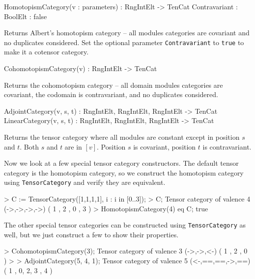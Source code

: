\begin{intrinsics}
HomotopismCategory(v : parameters) : RngIntElt -> TenCat
    Contravariant : BoolElt : false
\end{intrinsics}

Returns Albert's homotopism category -- all modules categories are covariant 
and 
no duplicates considered.
Set the optional parameter {\tt Contravariant} to {\tt true} to make it a cotensor category.

\begin{intrinsics}
CohomotopismCategory(v) : RngIntElt -> TenCat
\end{intrinsics}

Returns the cohomotopism category -- all domain modules categories are 
covariant, the codomain is contravariant, and no duplicates considered.

\begin{intrinsics}
AdjointCategory(v, s, t) :  RngIntElt, RngIntElt, RngIntElt -> TenCat
LinearCategory(v, s, t) :  RngIntElt, RngIntElt, RngIntElt -> TenCat
\end{intrinsics}

Returns the tensor category where all modules are constant except in position 
$s$ and $t$.  Both $s$ and $t$ are in $[v]$.
Position $s$ is covariant, position $t$ is contravariant.

\begin{example}[TenCatSpecial]

Now we look at a few special tensor category constructors.
The default tensor category is the homotopism category, so we construct the homotopism category using \texttt{TensorCategory} and verify they are equivalent.
\begin{code}
> C := TensorCategory([1,1,1,1], {{i} : i in [0..3]});
> C;
Tensor category of valence 4 (->,->,->,->) ({ 1 },{ 2 },{ 0 },{ 3 })
> HomotopismCategory(4) eq C;
true
\end{code}

The other special tensor categories can be constructed using \texttt{TensorCategory} as well, but we just construct a few to show their properties.
\begin{code}
> CohomotopismCategory(3);
Tensor category of valence 3 (->,->,<-) ({ 1 },{ 2 },{ 0 })
> 
> AdjointCategory(5, 4, 1);
Tensor category of valence 5 (<-,==,==,->,==) ({ 1 },{ 0, 2, 3 },{ 4 })
\end{code}
\end{example}

